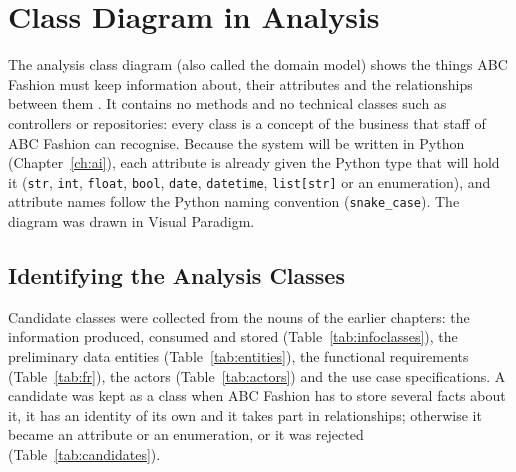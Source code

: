 \section{Class Diagram in Analysis}
\label{sec:analysisclass}

The analysis class diagram (also called the domain model) shows the things ABC Fashion must keep information about, their attributes and the relationships between them \cite{dennis2020}. It contains no methods and no technical classes such as controllers or repositories: every class is a concept of the business that staff of ABC Fashion can recognise. Because the system will be written in Python (Chapter~\ref{ch:ai}), each attribute is already given the Python type that will hold it (\texttt{str}, \texttt{int}, \texttt{float}, \texttt{bool}, \texttt{date}, \texttt{datetime}, \texttt{list[str]} or an enumeration), and attribute names follow the Python naming convention (\texttt{snake\_case}). The diagram was drawn in Visual Paradigm.

\subsection{Identifying the Analysis Classes}
\label{subsec:findclasses}
Candidate classes were collected from the nouns of the earlier chapters: the information produced, consumed and stored (Table~\ref{tab:infoclasses}), the preliminary data entities (Table~\ref{tab:entities}), the functional requirements (Table~\ref{tab:fr}), the actors (Table~\ref{tab:actors}) and the use case specifications. A candidate was kept as a class when ABC Fashion has to store several facts about it, it has an identity of its own and it takes part in relationships; otherwise it became an attribute or an enumeration, or it was rejected (Table~\ref{tab:candidates}).

